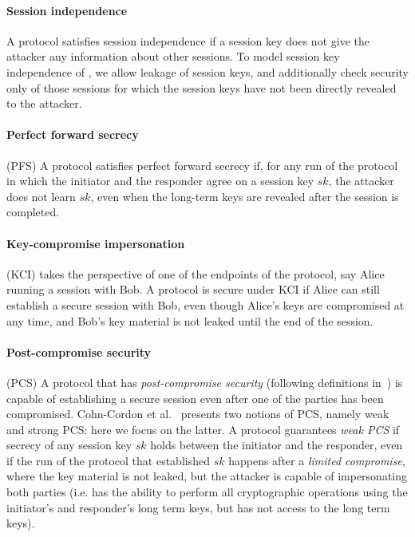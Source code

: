 \paragraph{Session independence}
A protocol satisfies session independence if  a session key does
not give the attacker any information about other sessions.  To model session
key independence of \mEdhoc, we allow leakage of session keys, and additionally
check security only of those sessions for which the session keys have not been
directly revealed to the attacker.

\paragraph{Perfect forward secrecy} (PFS) A protocol satisfies perfect forward
secrecy if, for any run of the protocol in which the initiator and the responder
agree on a session key $sk$, the attacker does not learn $sk$, even when the
long-term keys are revealed after the session is completed.

\paragraph{Key-compromise impersonation} (KCI)  takes the perspective of one
of the endpoints of the protocol, say Alice running a session with Bob. A
protocol is secure under KCI if Alice can still establish a secure session with
Bob, even though Alice's keys are compromised at any time, and Bob's key
material is not leaked until the end of the session.

\paragraph{Post-compromise security} (PCS) A protocol that has
\emph{post-compromise security} (following definitions in~\cite{cohn2016post})
is capable of establishing a secure session even after one of the parties has
been compromised. Cohn-Cordon et al.~\cite{cohn2016post} presents two notions of
PCS, namely weak and strong PCS: here we focus on the latter.
%
A protocol guarantees \emph{weak PCS} if secrecy of any session key $sk$ holds
between the initiator and the responder, even if the run of the protocol that
established $sk$ happens after a \emph{limited compromise}, where the key
material is not leaked, but the attacker is capable of impersonating both
parties (i.e. has the ability to perform all cryptographic operations using the
initiator's and responder's long term keys, but has not access to the long term
keys).

